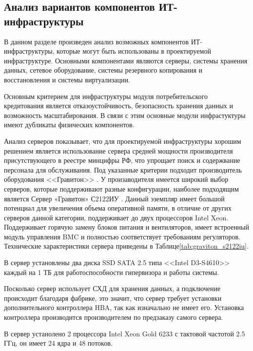 \documentclass[14pt, a4paper]{extarticle}
\begin{document}
\subsection{Анализ вариантов компонентов ИТ-инфраструктуры}

В данном разделе произведен анализ возможных компонентов ИТ-инфраструктуры,
которые могут быть использованы в проектируемой инфраструктуре. Основными
компонентами являются серверы, системы хранения данных, сетевое оборудование,
системы резервного копирования и восстановления и системы виртуализации.

Основным критерием для инфраструктуры модуля потребительского кредитования
является отказоустойчивость, безопасность хранения данных и возможность
масштабирования. В связи с этим основные модули инфрастуктуры имеют дубликаты
физических компонентов.

Анализ серверов показывает, что для проектируемой инфраструктуры хорошим решением
является использование сервера средней мощности производителя присутствующего
в реестре минцифры РФ, что упрощает поиск и содержвание персонала для
обслуживания. Под указанные критерии подходит производитель оборудования <<Гравитон>> \cite{graviton-site}.
У произаводителя имеется широкий выбор серверов, которые поддерживают
разные конфигурации, наиболее подходящим является Сервер «Гравитон» С2122ИУ \cite{graiton-server-s2122iu}.
Данный эземпляр имеет большой потенциал для увеличения объема оперативной памяти,
в отличие от других серверов данной категории, поддерживает до двух процессоров Intel
Xeon. Поддерживает горячую замену блоков питания и вентиляторов, имеет встроенный
модуль управления BMC и полностью соответствует требованиям регуляторов.
Технические характеристики сервера приведены в Таблице\;\ref{tab:graviton_s2122iu}.

В сервер установлены два диска SSD SATA 2.5 типа <<Intel D3-S4610>> каждый на
1 ТБ для работоспособности гипервизора и работы системы.

Посколько сервер использует СХД для хранения данных, а подключение происходит
благодаря фабрике, это значит, что сервер требует установки дополнительного
контроллера HBA, так как изначально не имеет его. Установка контроллера
производится производителем по предзаказу самого сервера.

В сервер устанолено 2 процессора Intel Xeon Gold 6233 с тактовой частотой 2.5 ГГц,
он имеет 24 ядра и 48 потоков.
\end{document}
